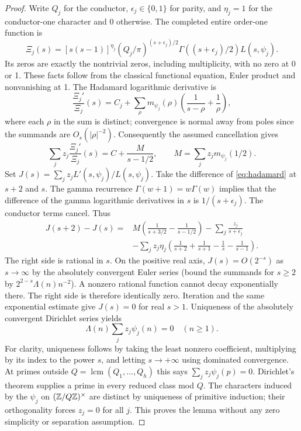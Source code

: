 \documentclass[11pt]{article}
\theoremstyle{remark}\newtheorem{remark}[theorem]{Remark}
\begin{document}
\begin{proof}
Write $Q_j$ for the conductor, $\epsilon_j\in\{0,1\}$ for parity, and $\eta_j=1$ for the conductor-one character and 0 otherwise. The completed entire order-one function is
\[
 \Xi_j(s)=[s(s-1)]^{\eta_j}(Q_j/\pi)^{(s+\epsilon_j)/2}
      \Gamma((s+\epsilon_j)/2)L(s,\psi_j).
\]
Its zeros are exactly the nontrivial zeros, including multiplicity, with no zero at 0 or 1. These facts follow from the classical functional equation, Euler product and nonvanishing at 1. The Hadamard logarithmic derivative is
\[
 \frac{\Xi_j'}{\Xi_j}(s)=C_j+\sum_\rho m_{\psi_j}(\rho)
       \left(\frac1{s-\rho}+\frac1\rho\right),
\]
where each $\rho$ in the sum is distinct; convergence is normal away from poles since the summands are $O_s(|\rho|^{-2})$. Consequently the assumed cancellation gives
\begin{equation}\label{eq:hadamard}
 \sum_j z_j\frac{\Xi_j'}{\Xi_j}(s)=C+\frac{M}{s-1/2},\qquad
 M=\sum_j z_j m_{\psi_j}(1/2).
\end{equation}
Set $J(s)=\sum_j z_j L'(s,\psi_j)/L(s,\psi_j)$. Take the difference of \eqref{eq:hadamard} at $s+2$ and $s$. The gamma recurrence $\Gamma(w+1)=w\Gamma(w)$ implies that the difference of the gamma logarithmic derivatives in $s$ is $1/(s+\epsilon_j)$. The conductor terms cancel. Thus
\begin{align*}
 J(s+2)-J(s)={}&M\left(\frac1{s+3/2}-\frac1{s-1/2}\right)
  -\sum_j\frac{z_j}{s+\epsilon_j}\\
 &-\sum_jz_j\eta_j\left(\frac1{s+2}+\frac1{s+1}-\frac1s-\frac1{s-1}\right).
\end{align*}
The right side is rational in $s$. On the positive real axis, $J(s)=O(2^{-s})$ as $s\to\infty$ by the absolutely convergent Euler series (bound the summands for $s\ge2$ by $2^{2-s}\Lambda(n)n^{-2}$). A nonzero rational function cannot decay exponentially there. The right side is therefore identically zero. Iteration and the same exponential estimate give $J(s)=0$ for real $s>1$. Uniqueness of the absolutely convergent Dirichlet series yields
\[
 \Lambda(n)\sum_j z_j\psi_j(n)=0\quad(n\ge1).
\]
For clarity, uniqueness follows by taking the least nonzero coefficient, multiplying by its index to the power $s$, and letting $s\to+\infty$ using dominated convergence. At primes outside $Q=\operatorname{lcm}(Q_1,\ldots,Q_h)$ this says $\sum_j z_j\psi_j(p)=0$. Dirichlet's theorem supplies a prime in every reduced class mod $Q$. The characters induced by the $\psi_j$ on $(\mathbb Z/Q\mathbb Z)^\times$ are distinct by uniqueness of primitive induction; their orthogonality forces $z_j=0$ for all $j$. This proves the lemma without any zero simplicity or separation assumption.
\end{proof}
\end{document}
